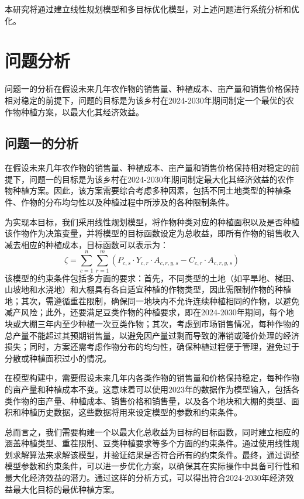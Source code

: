 \documentclass{cumcmthesis}
\begin{document}
本研究将通过建立线性规划模型和多目标优化模型，对上述问题进行系统分析和优化。


\section{问题分析}
问题一的分析在假设未来几年农作物的销售量、种植成本、亩产量和销售价格保持相对稳定的前提下，问题的目标是为该乡村在2024-2030年期间制定一个最优的农作物种植方案，以最大化其经济效益。
\subsection{问题一的分析}
在假设未来几年农作物的销售量、种植成本、亩产量和销售价格保持相对稳定的前提下，问题一的目标是为该乡村在2024-2030年期间制定最大化其经济效益的农作物种植方案。因此，该方案需要综合考虑多种因素，包括不同土地类型的种植条件、作物的分布均匀性以及种植过程中所涉及的各种限制条件。

为实现本目标，我们采用线性规划模型，将作物种类对应的种植面积以及是否种植该作物作为决策变量，并将模型的目标函数设定为总收益，即所有作物的销售收入减去相应的种植成本，目标函数可以表示为：
\begin{equation}
    \zeta = \sum_{c=1}^{n} \sum_{r=1}^{m} (P_{c,s} \cdot Y_{c,r} \cdot A_{c,r,y,s} - C_{c,r} \cdot A_{c,r,y,s})
\end{equation}
该模型的约束条件包括多方面的要求：首先，不同类型的土地（如平旱地、梯田、山坡地和水浇地）和大棚具有各自适宜种植的作物类型，因此需限制作物的种植地；其次，需遵循重茬限制，确保同一地块内不允许连续种植相同的作物，以避免减产风险；此外，还要满足豆类作物的种植要求，即在2024-2030年期间，每个地块或大棚三年内至少种植一次豆类作物；其次，考虑到市场销售情况，每种作物的总产量不能超过其预期销售量，以避免因产量过剩而导致的滞销或降价处理的经济损失；同时，方案还需考虑作物分布的均匀性，确保种植过程便于管理，避免过于分散或种植面积过小的情况。

在模型构建中，需要假设未来几年内各类作物的销售量和价格保持稳定，每种作物的亩产量和种植成本不变。这意味着可以使用2023年的数据作为模型输入，包括各类作物的亩产量、种植成本、销售价格和销售量，以及各个地块和大棚的类型、面积和种植历史数据，这些数据将用来设定模型的参数和约束条件。

总而言之，我们需要构建一个以最大化总收益为目标的目标函数，同时建立相应的涵盖种植类型、重茬限制、豆类种植要求等多个方面的约束条件。通过使用线性规划求解算法来求解该模型，并验证结果是否符合所有的约束条件。最终，通过调整模型参数和约束条件，可以进一步优化方案，以确保其在实际操作中具备可行性和最大化经济效益的潜力。通过这样的分析方式，可以得出符合2024-2030年经济效益最大化目标的最优种植方案。
\end{document}
